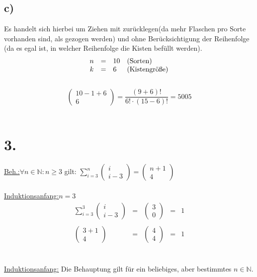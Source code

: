 \documentclass[a4paper]{scrartcl}
\begin{document}
	\subsection{c)}
		Es handelt sich hierbei um Ziehen mit zurücklegen(da mehr Flaschen pro Sorte vorhanden sind, 
		als gezogen werden) und ohne Berücksichtigung der Reihenfolge (da es egal ist, in welcher 
		Reihenfolge die Kisten befüllt werden). \\
		\[
		\begin{array}{ccll}
			n&=&10 &\text{(Sorten)} \\
			k&=&6 &\text{(Kistengröße)} \\
		\end{array} \\ 
		\] \\
		\[
		\begin{pmatrix}
			10-1+6 \\
			6
		\end{pmatrix}
		=\frac{(9+6)!}{6!\cdot (15-6)!}
		=5005
		\] \\
		

\section{3.}
	\underline{Beh.:}\quad \(\forall n\in\mathbb{N}:n\geq 3\) gilt:\quad 
	\(\sum\limits_{i=3}^n 
	\begin{pmatrix}
		i \\
		i-3
	\end{pmatrix}=
	\begin{pmatrix}
		n+1 \\
		4
	\end{pmatrix}
	\) \\ \\
	\underline{Induktionsanfang:}\quad \(n=3\) \\
	\[
	\begin{array}{rcccc}
		\sum\limits_{i=3}^3
		\begin{pmatrix}
			i \\
			i-3
		\end{pmatrix}
		&=&
		\begin{pmatrix}
			3 \\
			0
		\end{pmatrix}&=&1 \\ \\
		\begin{pmatrix}
			3+1 \\
			4
		\end{pmatrix}&=&
		\begin{pmatrix}
			4 \\
			4
		\end{pmatrix}&=&1
	\end{array}
	\] \\ \\
	\underline{Induktionsanfang:} Die Behauptung gilt für ein beliebiges, aber bestimmtes 	
	\(n\in\mathbb{N}\). \\ \\
	
\end{document}
